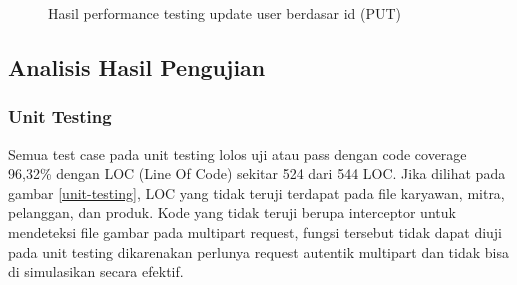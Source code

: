 \begin{figure}[H]
	{\par}
	\caption{Hasil performance testing update user berdasar id (PUT)}
	\label{update-user-testing}
\end{figure}

\newpage


\subsection{Analisis Hasil Pengujian}
\subsubsection{Unit Testing}
Semua test case pada unit testing lolos uji atau pass dengan code coverage 96,32\% dengan LOC (Line Of Code) sekitar 524 dari 544 LOC. Jika dilihat pada gambar \ref{unit-testing}, LOC yang tidak teruji terdapat pada file karyawan, mitra, pelanggan, dan produk. Kode yang tidak teruji berupa interceptor untuk mendeteksi file gambar pada multipart request, fungsi tersebut tidak dapat diuji pada unit testing dikarenakan perlunya request autentik multipart dan tidak bisa di simulasikan secara efektif.

